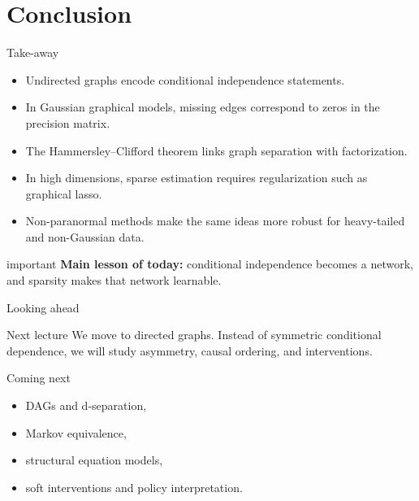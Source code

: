 \documentclass[dvipsnames,aspectratio=169,handout]{beamer}
\begin{document}

\section{Conclusion}

\begin{frame}{Take-away}
\begin{itemize}
    \item Undirected graphs encode conditional independence statements.
    \item In Gaussian graphical models, missing edges correspond to zeros in the precision matrix.
    \item The Hammersley--Clifford theorem links graph separation with factorization.
    \item In high dimensions, sparse estimation requires regularization such as graphical lasso.
    \item Non-paranormal methods make the same ideas more robust for heavy-tailed and non-Gaussian data.
\end{itemize}

\vspace{2mm}
\begin{beamercolorbox}[wd=\textwidth,sep=8pt,center,rounded=true,shadow=true]{important}
\textbf{Main lesson of today:}
conditional independence becomes a network, and sparsity makes that network learnable.
\end{beamercolorbox}
\end{frame}

\begin{frame}{Looking ahead}
\begin{block}{Next lecture}
We move to directed graphs.
Instead of symmetric conditional dependence, we will study asymmetry, causal ordering, and interventions.
\end{block}

\begin{alertblock}{Coming next}
\begin{itemize}
    \item DAGs and d-separation,
    \item Markov equivalence,
    \item structural equation models,
    \item soft interventions and policy interpretation.
\end{itemize}
\end{alertblock}
\end{frame}
\end{document}
